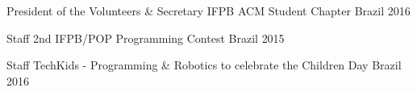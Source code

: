 

\begin{cvhonors}

  \cvhonor
    {President of the Volunteers \& Secretary} %
    {IFPB ACM Student Chapter} %
    {Brazil} %
    {2016} %

  \cvhonor
    {Staff} %
    {2nd IFPB/POP Programming Contest} %
    {Brazil} %
    {2015} %

  \cvhonor
    {Staff} %
    {TechKids - Programming \& Robotics to celebrate the Children Day} %
    {Brazil} %
    {2016} %

\end{cvhonors}
